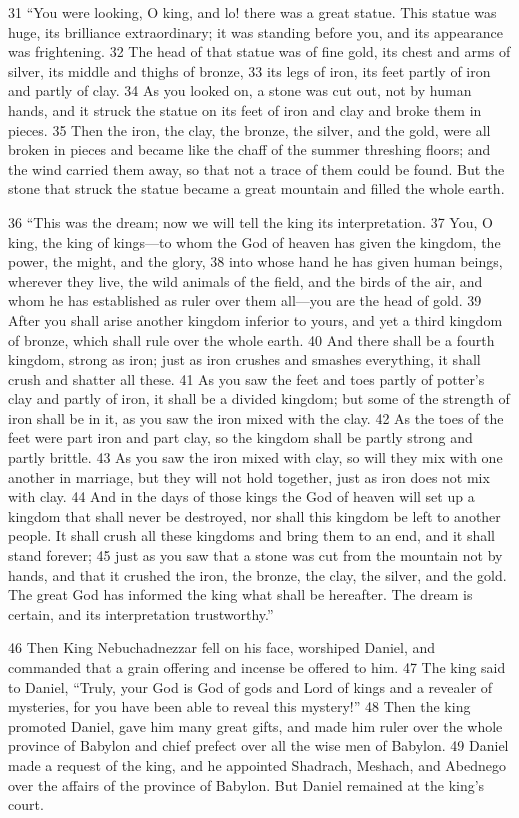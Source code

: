 31 ``You were looking, O king, and lo! there was a great statue. This statue 
was huge, its brilliance extraordinary; it was standing before you, and its 
appearance was frightening. 32 The head of that statue was of fine gold, its 
chest and arms of silver, its middle and thighs of bronze, 33 its legs of iron, 
its feet partly of iron and partly of clay. 34 As you looked on, a stone was 
cut out, not by human hands, and it struck the statue on its feet of iron and 
clay and broke them in pieces. 35 Then the iron, the clay, the bronze, the 
silver, and the gold, were all broken in pieces and became like the chaff of 
the summer threshing floors; and the wind carried them away, so that not a 
trace of them could be found. But the stone that struck the statue became a 
great mountain and filled the whole earth.

36 ``This was the dream; now we will tell the king its interpretation. 37 You, O 
king, the king of kings—to whom the God of heaven has given the kingdom, the 
power, the might, and the glory, 38 into whose hand he has given human beings, 
wherever they live, the wild animals of the field, and the birds of the air, 
and whom he has established as ruler over them all---you are the head of gold. 
39 After you shall arise another kingdom inferior to yours, and yet a third 
kingdom of bronze, which shall rule over the whole earth. 40 And there shall be 
a fourth kingdom, strong as iron; just as iron crushes and smashes everything, 
it shall crush and shatter all these. 41 As you saw the feet and toes partly of 
potter's clay and partly of iron, it shall be a divided kingdom; but some of 
the strength of iron shall be in it, as you saw the iron mixed with the clay. 
42 As the toes of the feet were part iron and part clay, so the kingdom shall 
be partly strong and partly brittle. 43 As you saw the iron mixed with clay, 
so will they mix with one another in marriage, but they will not hold together, 
just as iron does not mix with clay. 44 And in the days of those kings the God 
of heaven will set up a kingdom that shall never be destroyed, nor shall this 
kingdom be left to another people. It shall crush all these kingdoms and bring 
them to an end, and it shall stand forever; 45 just as you saw that a stone was 
cut from the mountain not by hands, and that it crushed the iron, the bronze, 
the clay, the silver, and the gold. The great God has informed the king what 
shall be hereafter. The dream is certain, and its interpretation trustworthy.''

46 Then King Nebuchadnezzar fell on his face, worshiped Daniel, and commanded 
that a grain offering and incense be offered to him. 47 The king said to Daniel,
``Truly, your God is God of gods and Lord of kings and a revealer of mysteries, 
for you have been able to reveal this mystery!'' 48 Then the king promoted 
Daniel, gave him many great gifts, and made him ruler over the whole province 
of Babylon and chief prefect over all the wise men of Babylon. 49 Daniel made 
a request of the king, and he appointed Shadrach, Meshach, and Abednego over 
the affairs of the province of Babylon. But Daniel remained at the king's court.
